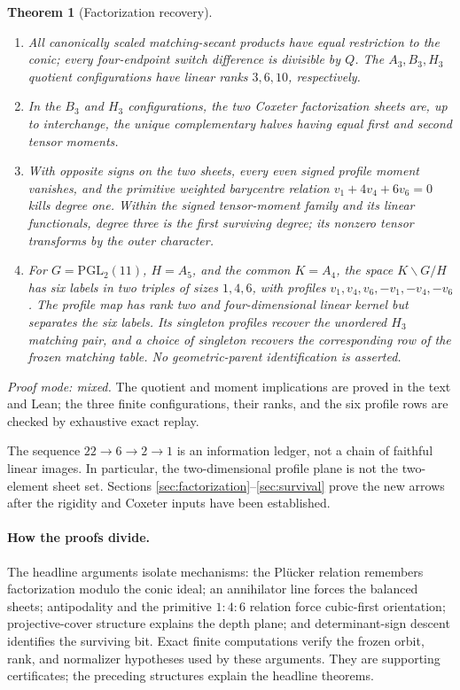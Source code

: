 \documentclass[11pt]{article}
\newtheorem{theorem}{Theorem}[section]
\theoremstyle{definition}
\theoremstyle{remark}
\begin{document}
\begin{theorem}[Factorization recovery]
\label{thm:headline-factorization}
\begin{enumerate}[label=\textup{(F\arabic*)},leftmargin=*]
\item All canonically scaled matching-secant products have equal
restriction to the conic; every four-endpoint switch difference is
divisible by $Q$.  The $A_3,B_3,H_3$ quotient configurations have linear
ranks $3,6,10$, respectively.
\item In the $B_3$ and $H_3$ configurations, the two Coxeter
factorization sheets are, up to interchange, the unique complementary
halves having equal first and second tensor moments.
\item With opposite signs on the two sheets, every even signed profile
moment vanishes, and the primitive weighted barycentre relation
$v_1+4v_4+6v_6=0$ kills degree one.  Within the signed tensor-moment
family and its linear functionals, degree three is the first surviving
degree; its nonzero tensor transforms by the outer character.
\item For $G=\mathrm{PGL}_2(11)$, $H=A_5$, and the common
$K=A_4$, the space $K\backslash G/H$ has six labels in two triples of
sizes $1,4,6$, with profiles
$v_1,v_4,v_6,-v_1,-v_4,-v_6$.  The profile map has rank two and
four-dimensional linear kernel but separates the six labels.  Its
singleton profiles recover the unordered $H_3$ matching pair, and a
choice of singleton recovers the corresponding row of the frozen matching
table.  No geometric-parent identification is asserted.
\end{enumerate}
\end{theorem}
\noindent\emph{Proof mode: mixed.}  The quotient and moment implications
are proved in the text and Lean; the three finite configurations, their
ranks, and the six profile rows are checked by exhaustive exact replay.

The sequence $22\to6\to2\to1$ is an information ledger, not a chain of
faithful linear images.  In particular, the two-dimensional profile plane
is not the two-element sheet set.  Sections
\ref{sec:factorization}--\ref{sec:survival} prove the new arrows after the
rigidity and Coxeter inputs have been established.

\paragraph{How the proofs divide.}
The headline arguments isolate mechanisms: the Pl\"ucker relation remembers
factorization modulo the conic ideal; an annihilator line forces the
balanced sheets; antipodality and the primitive $1:4:6$ relation force
cubic-first orientation; projective-cover structure explains the depth
plane; and determinant-sign descent identifies the surviving bit.  Exact
finite computations verify the frozen orbit, rank, and normalizer
hypotheses used by these arguments.  They are supporting certificates; the
preceding structures explain the headline theorems.
\end{document}
